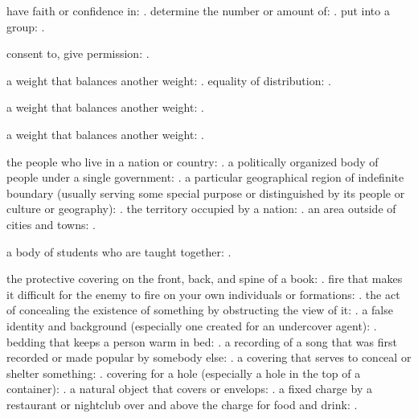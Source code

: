   have faith or confidence in: . determine the number or amount of: . put into a group: .

  consent to, give permission: .

  a weight that balances another weight: . equality of distribution: .

  a weight that balances another weight: .

  a weight that balances another weight: .

  the people who live in a nation or country: . a politically organized body of people under a single government: . a particular geographical region of indefinite boundary (usually serving some special purpose or distinguished by its people or culture or geography): . the territory occupied by a nation: . an area outside of cities and towns: .

  a body of students who are taught together: .

  the protective covering on the front, back, and spine of a book: . fire that makes it difficult for the enemy to fire on your own individuals or formations: . the act of concealing the existence of something by obstructing the view of it: . a false identity and background (especially one created for an undercover agent): . bedding that keeps a person warm in bed: . a recording of a song that was first recorded or made popular by somebody else: . a covering that serves to conceal or shelter something: . covering for a hole (especially a hole in the top of a container): . a natural object that covers or envelops: . a fixed charge by a restaurant or nightclub over and above the charge for food and drink: .

